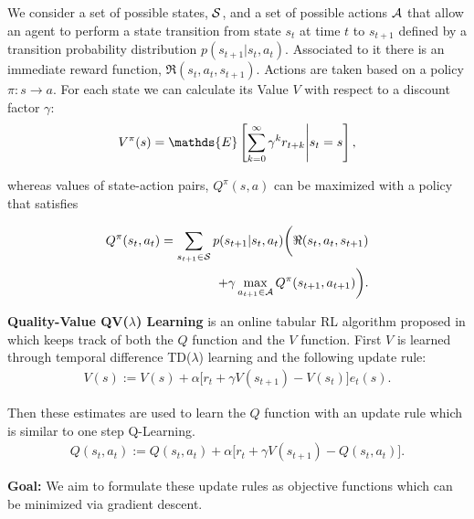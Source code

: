 \documentclass[landscape,a0paper,fontscale=0.292]{baposter}
\begin{document}
\begin{poster}
{We consider a set of possible states, $\cal S$, and a set of possible actions $\cal A$ that allow an agent to perform a state transition from state $s_t$ at time $t$ to $s_{t+1}$ defined by a transition probability distribution $p(s_{t+1} | s_{t}, a_{t})$. Associated to it there is an immediate reward function, $\Re (s_{t}, a_{t}, s_{t+1})$. Actions are taken based on a policy $\pi:s \rightarrow a$. For each state we can calculate its Value $V$ with respect to a discount factor $\gamma$:
\begin{align*}
\centering
V^{\pi}(s) = \mathds{E} \left[\sum_{k=0}^{\infty} \gamma^{k} r_{t+k} \middle| s_t = s \right],
\label{eq: value_function}
\end{align*}

whereas values of state-action pairs, $Q^{\pi}(s,a)$ can be maximized with a policy that satisfies

\begin{align*}
Q^{\pi}(s_{t}, a_{t}) = \sum_{s_{t+1}\in \cal S} p(s_{t+1} | s_{t}, a_{t}) 
						\bigg(\Re(s_{t}, a_{t}, s_{t+1}) \\
 					+ \gamma \max_{a_{t+1} \in \cal A} Q^{\pi}
                        (s_{t+1}, a_{t+1})\bigg).
\end{align*}


\textbf{Quality-Value QV($\lambda$) Learning} is an online tabular RL algorithm proposed in \cite{dqv} which keeps
track of both the $Q$ function and the $V$ function. First $V$ is learned through temporal difference TD($\lambda$) learning and the following update rule:
\begin{align*}
V(s):= V(s) + \alpha \big[ r_{t} + \gamma V(s_{t+1}) - V(s_t) \big] e_{t}(s).
\label{eq: V_update}
\end{align*}

Then these estimates are used to learn the $Q$ function with an update rule which is similar to one step Q-Learning.
\begin{align*}
Q(s_{t}, a_{t}):= Q(s_{t}, a_{t}) + \alpha \big[r_{t} + \gamma V(s_{t+1}) - Q(s_{t}, a_{t}) \big].
\label{eq: Q_update}
\end{align*}

\textbf{Goal:} We aim to formulate these update rules as objective functions which can be minimized via gradient descent.

}



\end{poster}
\end{document}
